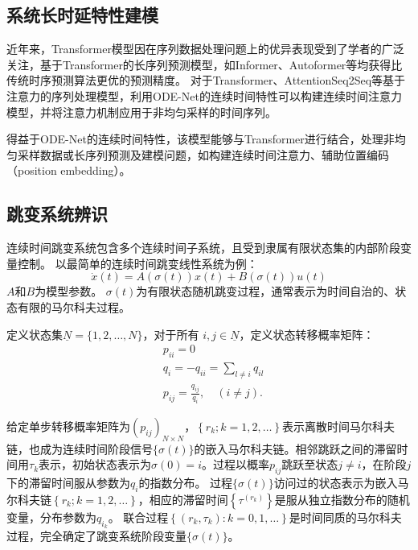 \subsection{系统长时延特性建模}
近年来，Transformer模型\cite{Vaswani2017}因在序列数据处理问题上的优异表现受到了学者的广泛关注，基于Transformer的长序列预测模型，如Informer\cite{Zhou2020}、Autoformer\cite{Wu2021}等均获得比传统时序预测算法更优的预测精度。
对于Transformer、AttentionSeq2Seq等基于注意力的序列处理模型，利用ODE-Net的连续时间特性可以构建连续时间注意力模型\cite{chen2021continuous}，并将注意力机制应用于非均匀采样的时间序列。

得益于ODE-Net的连续时间特性，该模型能够与Transformer进行结合，处理非均匀采样数据或长序列预测及建模问题，如构建连续时间注意力\cite{chen2021continuous}、辅助位置编码（position embedding）\cite{Liu2020}。
\subsection{跳变系统辨识}
连续时间跳变系统包含多个连续时间子系统，且受到隶属有限状态集的内部阶段变量控制\cite{8709809}。
以最简单的连续时间跳变线性系统\cite{fang2002stabilization}为例：
\begin{equation}
    \dot{x}(t)=A(\sigma(t)) x(t)+B(\sigma(t)) u(t)
\end{equation}
$A$和$B$为模型参数。
$\sigma(t)$为有限状态随机跳变过程，通常表示为时间自治的、状态有限的马尔科夫过程。

定义状态集$\underline{N}=\{1,2, \ldots, N\}$，对于所有 $i, j \in \underline{N}$，定义状态转移概率矩阵：
\begin{equation}
    \begin{aligned}
    &p_{i i}=0\\
    &q_i=-q_{i i}=\sum_{l \neq i} q_{i l}\\
    &p_{i j}=\frac{q_{i j}}{q_i}, \quad(i \neq j) .
    \end{aligned}
\end{equation}

给定单步转移概率矩阵为$\left(p_{i j}\right)_{N \times N}$，$\left\{r_k ; k=1,2, \ldots\right\}$表示离散时间马尔科夫链，也成为连续时间阶段信号$\{\sigma(t)\}$的嵌入马尔科夫链。相邻跳跃之间的滞留时间用$\tau_k$表示，初始状态表示为$\sigma (0)=i$。过程以概率$p_{ij}$跳跃至状态$j\neq i$，在阶段$j$下的滞留时间服从参数为$q_i$的指数分布。
过程$\{\sigma(t)\}$访问过的状态表示为嵌入马尔科夫链$\left\{r_k ; k=1,2, \ldots\right\}$，相应的滞留时间$\left\{\tau^{\left(r_k\right)}\right\}$是服从独立指数分布的随机变量，分布参数为$q_{i_k}$。
联合过程$\left\{\left(r_k, \tau_k\right): k=0,1, \ldots\right\}$是时间同质的马尔科夫过程，完全确定了跳变系统阶段变量$\{\sigma(t)\}$。

